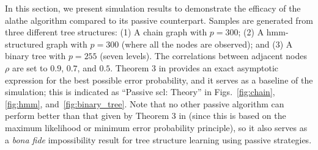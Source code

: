 \documentclass[11pt,onecolumn]{article}
\begin{document}
In this section, we present   simulation results to demonstrate the efficacy of the \ac{alathe} algorithm compared to its passive counterpart. Samples are generated from three different tree  structures: (1) A chain graph with $p=300$; (2) A \ac{hmm}-structured graph with $p=300$ (where all the nodes are observed); and (3) A binary tree with $p = 255$ (seven levels). The correlations between adjacent nodes $\rho$ are set to $0.9$, $0.7$, and $0.5$. Theorem 3 in \cite{tandon2020exact} provides an exact asymptotic expression for the best possible error probability, and it serves as a baseline of the simulation; this is indicated as ``Passive \ac{scl}: Theory'' in  Figs.~\ref{fig:chain},  \ref{fig:hmm}, and~\ref{fig:binary_tree}. Note that no other passive algorithm can perform better than that given by Theorem 3 in \cite{tandon2020exact} (since this is based on the maximum likelihood or minimum error probability principle), so it also serves as a {\em bona fide} impossibility result for tree structure learning using passive strategies.
\end{document}
